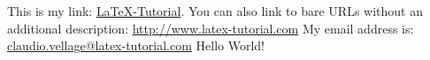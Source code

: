 \documentclass{article}
\begin{document}
This is my link: \href{http://www.latex-tutorial.com}{LaTeX-Tutorial}.
You can also link to bare URLs without an additional description: \url{http://www.latex-tutorial.com}
My email address is: \href{mailto:claudio.vellage@latex-tutorial.com}{claudio.vellage@latex-tutorial.com}
Hello World!
\end{document}
